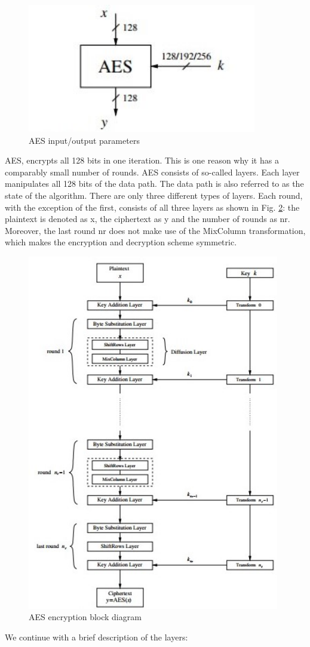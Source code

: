 \documentclass[../main.tex]{subfiles}
\begin{document}
\begin{figure}[h]
\centering
\includegraphics[width=10cm]{diagrams/cryp3.jpg}

\caption{AES input/output parameters}
\label{fig:cryp3}
\end{figure}
AES, encrypts all 128 bits in one iteration. This is
one reason why it has a comparably small number of rounds.
AES consists of so-called layers. Each layer manipulates all 128 bits of the data
path. The data path is also referred to as the state of the algorithm. There are only
three different types of layers. Each round, with the exception of the first, consists
of all three layers as shown in Fig. \ref{fig:cryp4}: the plaintext is denoted as x, the ciphertext
as y and the number of rounds as nr. Moreover, the last round nr does not make
use of the MixColumn transformation, which makes the encryption and decryption
scheme symmetric.\cite{10.5555/1721909}
\begin{figure}[h]
\centering
\includegraphics[width=11cm]{diagrams/cryp4.jpg}

\caption{AES encryption block diagram}
\label{fig:cryp4}
\end{figure}
We continue with a brief description of the layers:
\end{document}
